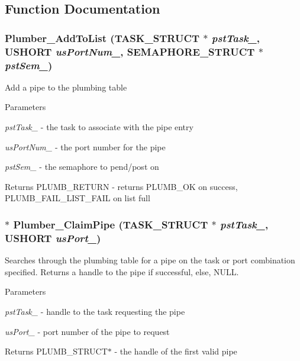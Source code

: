 \subsection{Function Documentation}
\subsubsection[{Plumber\_\-AddToList}]{ Plumber\_\-AddToList ({\bf TASK\_\-STRUCT} $\ast$ {\em pstTask\_\-}, \/  USHORT {\em usPortNum\_\-}, \/  {\bf SEMAPHORE\_\-STRUCT} $\ast$ {\em pstSem\_\-})}\label{plumber_8c_a11877aa64388d53bad819646ad80704a}
Add a pipe to the plumbing table


\begin{DoxyParams}{Parameters}
\item[{\em pstTask\_\-}]-\/ the task to associate with the pipe entry \item[{\em usPortNum\_\-}]-\/ the port number for the pipe \item[{\em pstSem\_\-}]-\/ the semaphore to pend/post on \end{DoxyParams}
\begin{DoxyReturn}{Returns}
PLUMB\_\-RETURN -\/ returns PLUMB\_\-OK on success, PLUMB\_\-FAIL\_\-LIST\_\-FAIL on list full 
\end{DoxyReturn}
\subsubsection[{Plumber\_\-ClaimPipe}]{ $\ast$ Plumber\_\-ClaimPipe ({\bf TASK\_\-STRUCT} $\ast$ {\em pstTask\_\-}, \/  USHORT {\em usPort\_\-})}\label{plumber_8c_ae2978a10b0f4460863a708d63e49ab25}
Searches through the plumbing table for a pipe on the task or port combination specified. Returns a handle to the pipe if successful, else, NULL.


\begin{DoxyParams}{Parameters}
\item[{\em pstTask\_\-}]-\/ handle to the task requesting the pipe \item[{\em usPort\_\-}]-\/ port number of the pipe to request \end{DoxyParams}
\begin{DoxyReturn}{Returns}
PLUMB\_\-STRUCT$\ast$ -\/ the handle of the first valid pipe 
\end{DoxyReturn}
